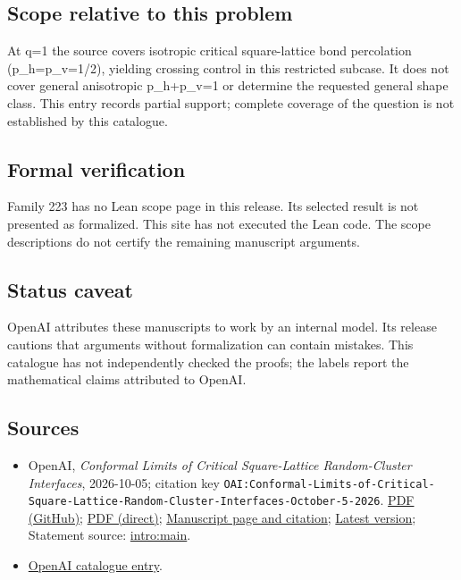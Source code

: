 \documentclass[11pt]{article}
\begin{document}
\subsection{Scope relative to this problem}
At q=1 the source covers isotropic critical square-lattice bond percolation (p\_h=p\_v=1/2), yielding crossing control in this restricted subcase. It does not cover general anisotropic p\_h+p\_v=1 or determine the requested general shape class. This entry records partial support; complete coverage of the question is not established by this catalogue.

\subsection{Formal verification}
Family 223 has no Lean scope page in this release. Its selected result is not presented as formalized. This site has not executed the Lean code. The scope descriptions do not certify the remaining manuscript arguments.

\subsection{Status caveat}
OpenAI attributes these manuscripts to work by an internal model. Its release cautions that arguments without formalization can contain mistakes. This catalogue has not independently checked the proofs; the labels report the mathematical claims attributed to OpenAI.

\subsection{Sources}
\begin{itemize}
\item OpenAI, \emph{Conformal Limits of Critical Square-Lattice Random-Cluster Interfaces}, 2026-10-05; citation key \texttt{OAI:Conformal-Limits-of-Critical-Square-Lattice-Random-Cluster-Interfaces-October-5-2026}. \href{https://github.com/openai/math/blob/adc7f1241b42e322a6451854ab7e4b4c146bf78a/preprints/Conformal-Limits-of-Critical-Square-Lattice-Random-Cluster-Interfaces-October-5-2026/paper.pdf}{PDF (GitHub)}; \href{https://github.com/openai/math/raw/adc7f1241b42e322a6451854ab7e4b4c146bf78a/preprints/Conformal-Limits-of-Critical-Square-Lattice-Random-Cluster-Interfaces-October-5-2026/paper.pdf}{PDF (direct)}; \href{https://github.com/openai/math/blob/adc7f1241b42e322a6451854ab7e4b4c146bf78a/preprints/Conformal-Limits-of-Critical-Square-Lattice-Random-Cluster-Interfaces-October-5-2026/README.md}{Manuscript page and citation}; \href{https://github.com/openai/math/blob/main/preprints/Conformal-Limits-of-Critical-Square-Lattice-Random-Cluster-Interfaces-October-5-2026/paper.pdf}{Latest version}; Statement source: \href{https://github.com/openai/math/blob/adc7f1241b42e322a6451854ab7e4b4c146bf78a/preprints/Conformal-Limits-of-Critical-Square-Lattice-Random-Cluster-Interfaces-October-5-2026/build/sections/introduction.tex\#L125}{intro:main}.
\item \href{https://github.com/openai/math/blob/adc7f1241b42e322a6451854ab7e4b4c146bf78a/CONTENTS.md}{OpenAI catalogue entry}.
\end{itemize}
\end{document}
